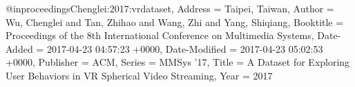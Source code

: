 @inproceedings{Chenglei:2017:vrdataset,
Address = {Taipei, Taiwan},
Author = {Wu, Chenglei and Tan, Zhihao and Wang, Zhi and Yang, Shiqiang},
Booktitle = {Proceedings of the 8th International Conference on Multimedia Systems},
Date-Added = {2017-04-23 04:57:23 +0000},
Date-Modified = {2017-04-23 05:02:53 +0000},
Publisher = {ACM},
Series = {MMSys '17},
Title = {A Dataset for Exploring User Behaviors in VR Spherical Video Streaming},
Year = {2017}}